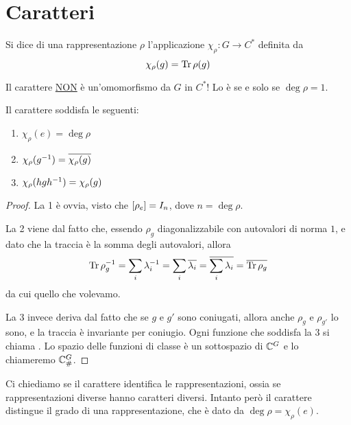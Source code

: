\section{Caratteri}

\begin{mydef}
  Si dice  di una rappresentazione $\rho$ l'applicazione $\chi_\rho: G \rightarrow C^*$ definita da 
  \[
  \chi_\rho(g)=\operatorname{Tr} \rho(g)
  \]
\end{mydef}

\begin{Achtung}
  Il carattere \underline{NON} è un'omomorfismo da $G$ in $C^*$! Lo è se e solo se $\deg \rho = 1$. 
\end{Achtung}

\begin{myprop}
  Il carattere soddisfa le seguenti:
  \begin{enumerate}
    \item $\chi_\rho(e)=\deg\rho$
    \item $\chi_\rho(g^{-1})=\overline{\chi_\rho(g)}$
    \item $\chi_\rho(hgh^{-1})=\chi_\rho(g)$
  \end{enumerate}
\end{myprop}

\begin{proof}
  La 1 è ovvia, visto che $[\rho_e]= I_n$, dove $n=\deg \rho$.
  
  La 2 viene dal fatto che, essendo $\rho_g$ diagonalizzabile con autovalori di norma $1$, e dato che la traccia è la somma degli autovalori, allora
  \[
		\operatorname{Tr}\rho_g^{-1} = \sum_i \lambda_i^{-1} = \sum_i \overline{\lambda_i} = \overline{\sum_i \lambda_i} = \overline{\operatorname{Tr}\rho_g} 
  \]
  da cui quello che volevamo.
  
La 3 invece deriva dal fatto che se $g$ e $g'$ sono coniugati, allora anche $\rho_g$ e $\rho_{g'}$ lo sono, e la traccia è invariante per coniugio. Ogni funzione che soddisfa la 3 si chiama . Lo spazio delle funzioni di classe è un sottospazio di $\mathbb C^{G}$ e lo chiameremo $\mathbb C^{G}_\#$.
\end{proof}

Ci chiediamo se il carattere identifica le rappresentazioni, ossia se rappresentazioni diverse hanno caratteri diversi.
Intanto però il carattere distingue il grado di una rappresentazione, che è dato da $\deg \rho = \chi_\rho(e)$.

